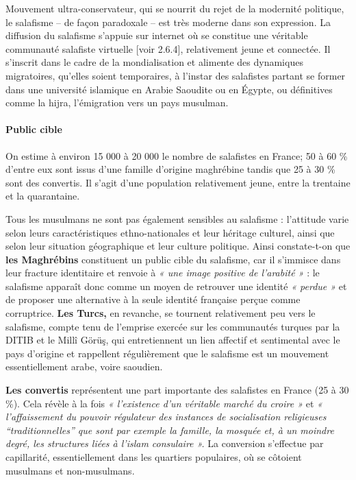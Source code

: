 Mouvement ultra-conservateur, qui se nourrit du rejet de la modernité
politique, le salafisme -- de façon paradoxale -- est très moderne dans
son expression. La diffusion du salafisme s'appuie sur internet où se
constitue une véritable communauté salafiste virtuelle {[}voir 2.6.4{]},
relativement jeune et connectée. Il s'inscrit dans le cadre de la
mondialisation et alimente des dynamiques migratoires, qu'elles soient
temporaires, à l'instar des salafistes partant se former dans une
université islamique en Arabie Saoudite ou en Égypte, ou définitives
comme la hijra, l'émigration vers un pays musulman.



\paragraph{Public cible}


On estime à environ 15 000 à 20 000 le nombre de salafistes en France;
50 à 60 \% d'entre eux sont issus d'une famille d'origine maghrébine
tandis que 25 à 30 \% sont des convertis. Il s'agit d'une population
relativement jeune, entre la trentaine et la quarantaine.

Tous les musulmans ne sont pas également sensibles au salafisme :
l'attitude varie selon leurs caractéristiques ethno-nationales et leur
héritage culturel, ainsi que selon leur situation géographique et leur
culture politique. Ainsi constate-t-on que \textbf{les Maghrébins}
constituent un public cible du salafisme, car il s'immisce dans leur
fracture
identitaire et renvoie à \emph{« une image positive de l'arabité »} :
le salafisme apparaît donc comme un moyen de retrouver une identité
\emph{« perdue »} et de proposer une alternative à la seule identité
française perçue comme corruptrice. \textbf{Les Turcs,} en revanche, se
tournent relativement peu vers le salafisme, compte tenu de l'emprise
exercée sur les communautés turques par la DITIB et le Millî Görüş, qui
entretiennent un lien affectif et sentimental avec le pays d'origine et
rappellent régulièrement que le salafisme est un mouvement
essentiellement arabe, voire saoudien.

\textbf{Les convertis} représentent une part importante des salafistes
en France (25 à 30 \%). Cela révèle à la fois \emph{« l'existence d'un
véritable marché du croire »} et \emph{« l'affaissement du pouvoir
régulateur des instances de socialisation religieuses
``traditionnelles'' que sont par exemple la famille, la mosquée et, à un
moindre degré, les structures liées à l'islam consulaire »}\emph{.} La
conversion s'effectue par capillarité, essentiellement dans les
quartiers populaires, où se côtoient musulmans et non-musulmans.

